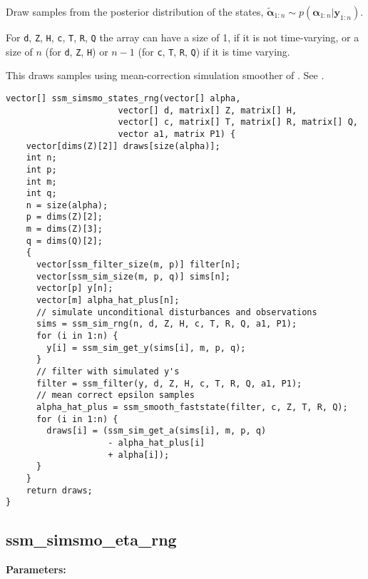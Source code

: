 \documentclass[]{book}
\renewcommand{\vec}[1]{\boldsymbol{#1}}
\begin{document}
Draw samples from the posterior distribution of the states,
\(\tilde{\vec{\alpha}}_{1:n} \sim p(\vec{\alpha}_{1:n} | \vec{y}_{1:n})\).

For \texttt{d}, \texttt{Z}, \texttt{H}, \texttt{c}, \texttt{T},
\texttt{R}, \texttt{Q} the array can have a size of 1, if it is not
time-varying, or a size of \(n\) (for \texttt{d}, \texttt{Z},
\texttt{H}) or \(n - 1\) (for \texttt{c}, \texttt{T}, \texttt{R},
\texttt{Q}) if it is time varying.

This draws samples using mean-correction simulation smoother of
\autocite{DurbinKoopman2002}. See \autocite[Sec 4.9]{DurbinKoopman2012}.

\begin{verbatim}
vector[] ssm_simsmo_states_rng(vector[] alpha,
                      vector[] d, matrix[] Z, matrix[] H,
                      vector[] c, matrix[] T, matrix[] R, matrix[] Q,
                      vector a1, matrix P1) {
    vector[dims(Z)[2]] draws[size(alpha)];
    int n;
    int p;
    int m;
    int q;
    n = size(alpha);
    p = dims(Z)[2];
    m = dims(Z)[3];
    q = dims(Q)[2];
    {
      vector[ssm_filter_size(m, p)] filter[n];
      vector[ssm_sim_size(m, p, q)] sims[n];
      vector[p] y[n];
      vector[m] alpha_hat_plus[n];
      // simulate unconditional disturbances and observations
      sims = ssm_sim_rng(n, d, Z, H, c, T, R, Q, a1, P1);
      for (i in 1:n) {
        y[i] = ssm_sim_get_y(sims[i], m, p, q);
      }
      // filter with simulated y's
      filter = ssm_filter(y, d, Z, H, c, T, R, Q, a1, P1);
      // mean correct epsilon samples
      alpha_hat_plus = ssm_smooth_faststate(filter, c, Z, T, R, Q);
      for (i in 1:n) {
        draws[i] = (ssm_sim_get_a(sims[i], m, p, q)
                    - alpha_hat_plus[i]
                    + alpha[i]);
      }
    }
    return draws;
}
\end{verbatim}

\subsection{ssm\_simsmo\_eta\_rng}\label{ssmux5fsimsmoux5fetaux5frng}

\textbf{Parameters:}
\end{document}
